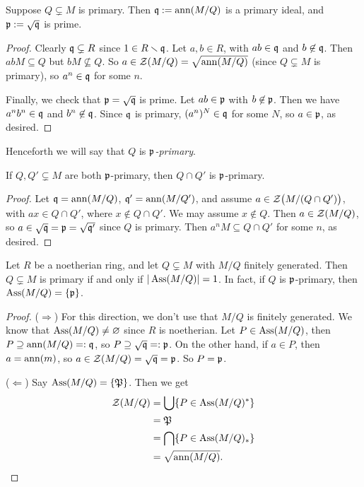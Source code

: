  \begin{proposition}
   Suppose $Q\subsetneq M$ is primary. Then $\mathfrak{q}:= \operatorname{ann} (M/Q)$ is a primary ideal, and
   $\mathfrak{p}:=\sqrt {\mathfrak{q}}$ is prime.
 \end{proposition}
 \begin{proof}
   Clearly $\mathfrak{q}\subsetneq R$ since $1\in R\smallsetminus \mathfrak{q}$. Let $a,b\in R$, with $ab\in
   \mathfrak{q}$ and $b\not\in \mathfrak{q}$. Then $abM\subseteq Q$ but $bM\not\subseteq Q$. So $a\in
   \mathcal{Z}(M/Q)=\sqrt{\operatorname{ann} (M/Q)}$ (since $Q\subsetneq M$ is primary), so $a^n\in \mathfrak{q}$ for some
   $n$.

   Finally, we check that $\mathfrak{p}=\sqrt {\mathfrak{q}}$ is prime. Let $ab\in \mathfrak{p}$ with $b\not\in \mathfrak{p}$. Then
   we have $a^nb^n\in \mathfrak{q}$ and $b^n\not\in \mathfrak{q}$. Since $\mathfrak{q}$ is primary, $(a^n)^N\in \mathfrak{q}$ for
   some $N$, so $a\in \mathfrak{p}$, as desired.
 \end{proof}
 \begin{definition}
   Henceforth we will say that $Q$ is \emph{$\mathfrak{p}$-primary}.
 \end{definition}
 \begin{proposition}
   If $Q,Q'\subsetneq M$ are both $\mathfrak{p}$-primary, then $Q\cap Q'$ is $\mathfrak{p}$-primary.
 \end{proposition}
 \begin{proof}
   Let $\mathfrak{q}=\operatorname{ann} (M/Q)$, $\mathfrak{q}'=\operatorname{ann} (M/Q')$, and assume $a\in \mathcal{Z}\bigl(M/(Q\cap Q')\bigr)$,
   with $ax\in Q\cap Q'$, where $x\not\in Q\cap Q'$. We may assume $x\not\in Q$. Then
   $a\in \mathcal{Z}(M/Q)$, so  $a\in \sqrt {\mathfrak{q}}=\mathfrak{p}=\sqrt{\mathfrak{q}'}$ since $Q$ is primary. Then
   $a^nM\subseteq Q\cap Q'$ for some $n$, as desired.
 \end{proof}
 \begin{proposition}
   Let $R$ be a noetherian ring, and let $Q\subsetneq M$ with $M/Q$ finitely generated.
   Then $Q\subsetneq M$ is primary if and only if $|\operatorname{Ass}(M/Q)|=1$. In fact, if $Q$ is
   $\mathfrak{p}$-primary, then $\operatorname{Ass} (M/Q)=\{\mathfrak{p}\}$.
 \end{proposition}
 \begin{proof}
   ($\Rightarrow$) For this direction, we don't use that $M/Q$ is finitely generated. We
   know that $\operatorname{Ass}(M/Q)\neq \varnothing$ since $R$ is noetherian. Let $P\in \operatorname{Ass} (M/Q)$,
   then $P\supseteq \operatorname{ann} (M/Q)=:\mathfrak{q}$, so $P\supseteq \sqrt {\mathfrak{q}}=:\mathfrak{p}$. On the other hand, if
   $a\in P$, then $a=\operatorname{ann}(m)$, so $a\in \mathcal{Z}(M/Q)=\sqrt {\mathfrak{q}}=\mathfrak{p}$. So $P=\mathfrak{p}$.

   \def\P{\mathfrak{P}}
   ($\Leftarrow$) Say $\ass (M/Q)=\{\P\}$. Then we get
   \begin{align*}
     \Z(M/Q) &= \bigcup \{P\in \ass (M/Q)^*\} \\ &= \P \\ &= \bigcap \{P\in
     \ass(M/Q)_*\} \\ &=\sqrt{\ann(M/Q)}. \qedhere
   \end{align*}
 \end{proof}
